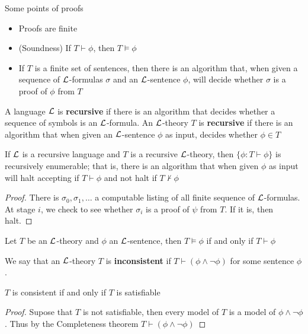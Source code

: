 \documentclass[11pt]{article}
\begin{document}
Some points of proofs
\begin{itemize}
\item Proofs are finite
\item (Soundness) If \(T\vdash\phi\), then \(T\vDash\phi\)
\item If \(T\) is a finite set of sentences, then there is an algorithm that,
when given a sequence of \(\mathcal{L}\)-formulas \(\sigma\) and an \(\mathcal{L}\)-sentence \(\phi\),
will decide whether \(\sigma\) is a proof of \(\phi\) from \(T\)
\end{itemize}

A language \(\mathcal{L}\) is \textbf{recursive} if there is an algorithm that decides
whether a sequence of symbols is an \(\mathcal{L}\)-formula. An \(\mathcal{L}\)-theory
\(T\) is \textbf{recursive} if there is an algorithm that when given an
\(\mathcal{L}\)-sentence \(\phi\) as input, decides whether \(\phi\in T\)

\begin{proposition}[]
\label{prop2.1.1}
If \(\mathcal{L}\) is a recursive language and \(T\) is a recursive \(\mathcal{L}\)-theory,
then \(\{\phi:T\vdash\phi\}\) is recursively enumerable; that is, there is an
algorithm that when given \(\phi\) as input will halt accepting if \(T\vdash\phi\)
and not halt if \(T\not\vdash\phi\)
\end{proposition}
\begin{proof}
There is \(\sigma_0,\sigma_1,\dots\) a computable listing of all finite
sequence of \(\mathcal{L}\)-formulas. At stage \(i\), we check to see whether
\(\sigma_i\) is a proof of \(\psi\) from \(T\). If it is, then halt.
\end{proof}

\begin{theorem}
Let \(T\) be an \(\mathcal{L}\)-theory and \(\phi\) an \(\mathcal{L}\)-sentence, then
\(T\vDash\phi\) if and only if \(T\vdash \phi\)
\end{theorem}

We say that an \(\mathcal{L}\)-theory \(T\) is \textbf{inconsistent} if
\(T\vdash(\phi\wedge\neg\phi)\) for some sentence \(\phi\).

\begin{corollary}[]
\(T\) is consistent if and only if \(T\) is satisfiable
\end{corollary}

\begin{proof}
Supose that \(T\) is not satisfiable, then every model of \(T\) is a model of
\(\phi\wedge\neg\phi\). Thus by the Completeness theorem
\(T\vdash(\phi\wedge\neg\phi)\) 
\end{proof}
\end{document}
